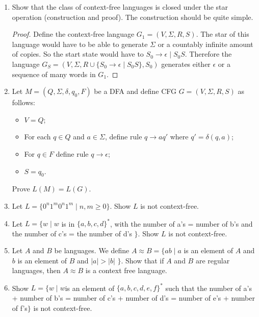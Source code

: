 \documentclass{article}
\begin{document}
\begin{enumerate}
        \item Show that the class of context-free languages is closed under the star operation (construction and proof). The construction should be quite simple.
            \begin{proof}
                Define the context-free language $G_1=(V, \Sigma, R, S)$. The star of this language would have to be able to generate $\Sigma$ or a countably infinite amount of copies. So the start state would have to $S_0\rightarrow \epsilon \mid S_0S$. Therefore the language $G_S=(V, \Sigma, R \cup \{S_0\rightarrow\epsilon\mid S_0S\}, S_0)$ generates either $\epsilon$ or a sequence of many words in $G_1$.
            \end{proof}
        \item Let $M=(Q,\Sigma, \delta, q_0, F)$ be a DFA and define CFG $G=(V,\Sigma,R,S)$ as follows:
            \begin{itemize}
                \item $V = Q$;
                \item For each $q\in Q$ and $ a\in \Sigma $, define rule $q\rightarrow aq'$ where $q'=\delta(q,a)$;
                \item For $q\in F$ define rule $q\rightarrow\epsilon$;
                \item $S=q_0$.
            \end{itemize}
            Prove $L(M) = L(G)$.

        \item Let $L=\{0^n1^m0^n1^m \mid n,m \geq 0\}$. Show $L$ is not context-free.

        \item Let $L=\{w\mid w $ is in $\{a,b,c,d\}^*$, with the number of a's = number of b's and the number of c's = the number of d's $\}$. Show $L$ is not context-free.

        \item Let $A$ and $B$ be languages. We define $A\approx B = \{ab \mid a $ is an element of $A$ and $b$ is an element of $B$ and $|a| > |b|$ $\}$. Show that if $A$ and $B$ are regular languages, then $A\approx B$ is a context free language.

        \item Show $L = \{w\mid w $is an element of $\{a,b,c,d,e,f\}^*$ such that the number of a's + number of b's = number of c's + number of d's = number of e's + number of f's$ \}$ is not context-free.
    \end{enumerate}
\end{document}
